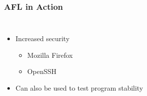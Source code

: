 \begin{frame}
\frametitle{AFL in Action}
\begin{columns}
\begin{itemize}
\item{Increased security}
\begin{itemize}
\item{Mozilla Firefox}
\item{OpenSSH}
\end{itemize}
\item{Can also be used to test program stability}
\end{itemize}
\begin{figure}
\end{figure}
\end{columns}
\end{frame}
